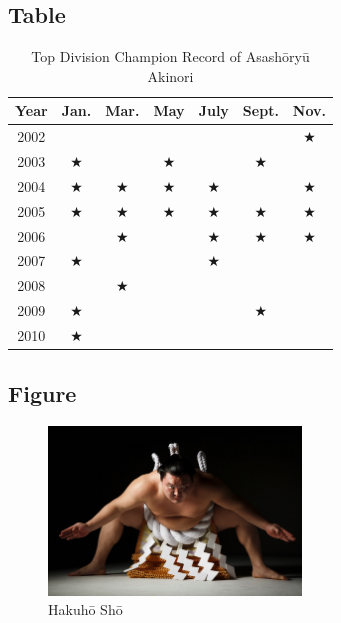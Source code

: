 \documentclass{article}
\begin{document}
    \subsection{Table}
    \begin{table}[htbp]
        \def\bs{$\bigstar$} %
        \centering
        \begin{tabular}{c|cccccc}
            \hline
            Year & Jan. & Mar. & May & July & Sept. & Nov. \\
            \hline
            2002 &      &      &     &      &       & \bs  \\
            2003 & \bs  &      & \bs &      & \bs   &      \\
            2004 & \bs  & \bs  & \bs & \bs  &       & \bs  \\
            2005 & \bs  & \bs  & \bs & \bs  & \bs   & \bs  \\
            2006 &      & \bs  &     & \bs  & \bs   & \bs  \\
            2007 & \bs  &      &     & \bs  &       &      \\
            2008 &      & \bs  &     &      &       &      \\
            2009 & \bs  &      &     &      & \bs   &      \\
            2010 & \bs  &      &     &      &       &      \\
            \hline
        \end{tabular}
        \caption{Top Division Champion Record of Asash\=ory\=u Akinori}
        \label{table} %
    \end{table}
    \subsection{Figure}
    \begin{figure}[htbp]
        \centering
        \includegraphics[width=0.6\textwidth]{img/Hakuho.jpg}
        \caption{Hakuh\=o Sh\=o}
        \label{figure} %
    \end{figure}
\end{document}
